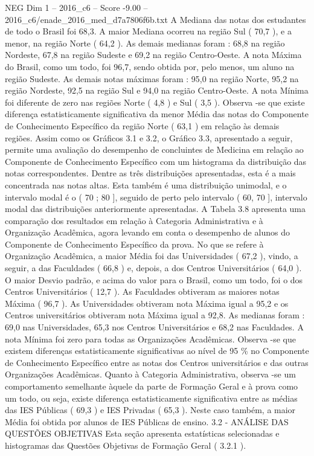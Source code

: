 \begin{textsample}{NEG Dim 1 – 2016\_c6 – Score -9.00 – 2016\_c6/enade\_2016\_med\_d7a7806f6b.txt}
A Mediana das notas dos estudantes de todo o Brasil foi 68,3.
A maior Mediana ocorreu na região Sul ( 70,7 ), e a menor, na região Norte ( 64,2 ).
As demais medianas foram : 68,8 na região Nordeste, 67,8 na região Sudeste e 69,2 na região Centro-Oeste.
A nota Máxima do Brasil, como um todo, foi 96,7, sendo obtida por, pelo menos, um aluno na região Sudeste.
As demais notas máximas foram : 95,0 na região Norte, 95,2 na região Nordeste, 92,5 na região Sul e 94,0 na região Centro-Oeste.
A nota Mínima foi diferente de zero nas regiões Norte ( 4,8 ) e Sul ( 3,5 ).
Observa -se que existe diferença estatisticamente significativa da menor Média das notas do Componente de Conhecimento Específico da região Norte ( 63,1 ) em relação às demais regiões.
Assim como os Gráficos 3.1 e 3.2, o Gráfico 3.3, apresentado a seguir, permite uma avaliação do desempenho de concluintes de Medicina em relação ao Componente de Conhecimento Específico com um histograma da distribuição das notas correspondentes.
Dentre as três distribuições apresentadas, esta é a mais concentrada nas notas altas.
Esta também é uma distribuição unimodal, e o intervalo modal é o ( 70 ; 80 ], seguido de perto pelo intervalo ( 60, 70 ], intervalo modal das distribuições anteriormente apresentadas.
A Tabela 3.8 apresenta uma comparação dos resultados em relação à Categoria Administrativa e à Organização Acadêmica, agora levando em conta o desempenho de alunos do Componente de Conhecimento Específico da prova.
No que se refere à Organização Acadêmica, a maior Média foi das Universidades ( 67,2 ), vindo, a seguir, a das Faculdades ( 66,8 ) e, depois, a dos Centros Universitários ( 64,0 ).
O maior Desvio padrão, e acima do valor para o Brasil, como um todo, foi o dos Centros Universitários ( 12,7 ).
As Faculdades obtiveram as maiores notas Máxima ( 96,7 ).
As Universidades obtiveram nota Máxima igual a 95,2 e os Centros universitários obtiveram nota Máxima igual a 92,8.
As medianas foram : 69,0 nas Universidades, 65,3 nos Centros Universitários e 68,2 nas Faculdades.
A nota Mínima foi zero para todas as Organizações Acadêmicas.
Observa -se que existem diferenças estatisticamente significativas ao nível de 95 \% no Componente de Conhecimento Específico entre as notas dos Centros universitários e das outras Organizações Acadêmicas.
Quanto à Categoria Administrativa, observa -se um comportamento semelhante àquele da parte de Formação Geral e à prova como um todo, ou seja, existe diferença estatisticamente significativa entre as médias das IES Públicas ( 69,3 ) e IES Privadas ( 65,3 ).
Neste caso também, a maior Média foi obtida por alunos de IES Públicas de ensino. 3.2 - ANÁLISE DAS QUESTÕES OBJETIVAS Esta seção apresenta estatísticas selecionadas e histogramas das Questões Objetivas de Formação Geral ( 3.2.1 ).

\end{textsample}
